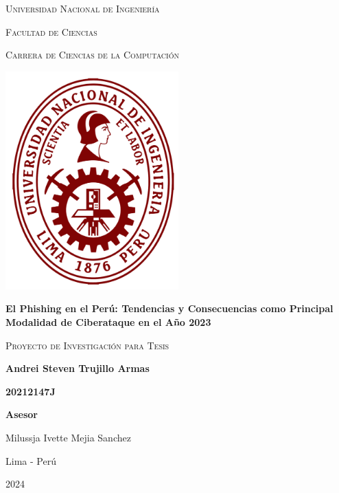 \begin{titlepage}
    \centering
    {\scshape\large Universidad Nacional de Ingeniería \par}
    \vspace{0.3cm}
    {\scshape\large Facultad de Ciencias \par}
    \vspace{0.3cm}
    {\scshape\large Carrera de Ciencias de la Computación \par}
    \vspace{0.3cm}
    \includegraphics[width=0.5\textwidth]{frontmatter/UNIlogo.png}\\[0.5cm]
    {\LARGE\bfseries El Phishing en el Perú: Tendencias y Consecuencias como Principal Modalidad de Ciberataque en el Año 2023 \par}
    \vspace{1cm}
    {\scshape\large Proyecto de Investigación para Tesis \par}
    \vfill
    
    {\large\bfseries Andrei Steven Trujillo Armas \par}
    {\large\bfseries 20212147J \par}
    \vspace{0.5cm}
    \vfill
    
    {\large\bfseries Asesor \par}
    {\large Milussja Ivette Mejia Sanchez}
    \vspace{0.5cm}
    \vfill

    {\large Lima - Perú}\\
    {\large 2024\par}
    \vspace{1cm}
\end{titlepage}
